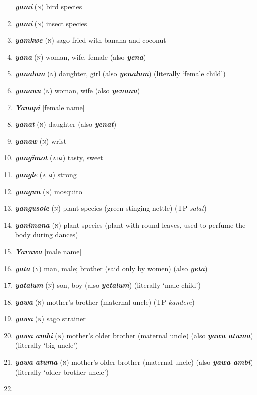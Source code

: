 \begin{enumerate}[noitemsep, label={}, align=left, widest=190, labelsep=1ex,leftmargin=*,itemindent=-10pt]
\textbf{\textit{yami}} (\textsc{n}) bird species \item 
\textbf{\textit{yami}} (\textsc{n}) insect species \item 
\textbf{\textit{yamkwe}} (\textsc{n}) sago fried with banana and coconut \item 
\textbf{\textit{yana}} (\textsc{n}) woman, wife, female (also \textbf{\textit{yena}}) \item 
\textbf{\textit{yanalum}} (\textsc{n}) daughter, girl (also \textbf{\textit{yenalum}}) (literally ‘female child’) \item 
\textbf{\textit{yananu}} (\textsc{n}) woman, wife (also \textbf{\textit{yenanu}}) \item 
\textbf{\textit{Yanapi}} [female name] \item 
\textbf{\textit{yanat}} (\textsc{n}) daughter (also \textbf{\textit{yenat}}) \item 
\textbf{\textit{yanaw}} (\textsc{n}) wrist \item 
\textbf{\textit{yangïmot}} (\textsc{adj}) tasty, sweet \item 
\textbf{\textit{yangle}} (\textsc{adj}) strong \item 
\textbf{\textit{yangun}} (\textsc{n}) mosquito \item 
\textbf{\textit{yangusole}} (\textsc{n}) plant species (green stinging nettle) (TP \textit{salat}) \item 
\textbf{\textit{yanïmana}} (\textsc{n}) plant species (plant with round leaves, used to perfume the body during dances) \item 
\textbf{\textit{Yaruwa}} [male name] \item 
\textbf{\textit{yata}} (\textsc{n}) man, male; brother (said only by women) (also \textbf{\textit{yeta}}) \item 
\textbf{\textit{yatalum}} (\textsc{n}) son, boy (also \textbf{\textit{yetalum}}) (literally ‘male child’) \item 
\textbf{\textit{yawa}} (\textsc{n}) mother’s brother (maternal uncle) (TP \textit{kandere}) \item 
\textbf{\textit{yawa}} (\textsc{n}) sago strainer \item 
\textbf{\textit{yawa ambi}} (\textsc{n}) mother’s older brother (maternal uncle) (also \textbf{\textit{yawa atuma}}) 
\linebreak (literally ‘big uncle’) \item 
\textbf{\textit{yawa atuma}} (\textsc{n}) mother’s older brother (maternal uncle) (also \textbf{\textit{yawa ambi}}) \linebreak (literally ‘older brother uncle’) \item 

\end{enumerate}
